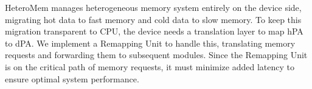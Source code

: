 HeteroMem manages heterogeneous memory system entirely on the device side, migrating hot data to fast memory and cold data to slow memory. To keep this migration transparent to CPU, the device needs a translation layer to map hPA to dPA. We implement a Remapping Unit to handle this, translating memory requests and forwarding them to subsequent modules. Since the Remapping Unit is on the critical path of memory requests, it must minimize added latency to ensure optimal system performance.


